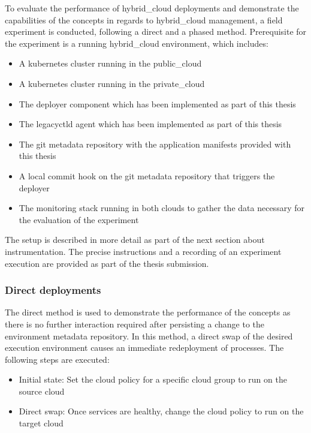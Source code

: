 \documentclass[../main.tex]{subfiles}
\begin{document}
    To evaluate the performance of \gls{hybrid_cloud} deployments and demonstrate the capabilities of the concepts in regards to \gls{hybrid_cloud} management, a field experiment is conducted, following a direct and a phased method.
    Prerequisite for the experiment is a running \gls{hybrid_cloud} environment, which includes:
    \begin{itemize}
        \setlength\itemsep{0em}
        \item A \gls{kubernetes} cluster running in the \gls{public_cloud}
        \item A \gls{kubernetes} cluster running in the \gls{private_cloud}
        \item The \gls{deployer} component which has been implemented as part of this thesis
        \item The \gls{legacyctld} agent which has been implemented as part of this thesis
        \item The \gls{git} metadata repository with the application manifests provided with this thesis
        \item A local commit hook on the \gls{git} metadata repository that triggers the \gls{deployer}
        \item The monitoring stack running in both \glspl{cloud} to gather the data necessary for the evaluation of the experiment
    \end{itemize}
    The setup is described in more detail as part of the next section about instrumentation.
    The precise instructions and a recording of an experiment execution are provided as part of the thesis submission.

    \subsubsection{Direct deployments}

    The direct method is used to demonstrate the performance of the concepts as there is no further interaction required after persisting a change to the environment metadata repository.
    In this method, a direct swap of the desired execution environment causes an immediate redeployment of processes.
    The following steps are executed:
    \begin{itemize}
        \setlength\itemsep{0em}
        \item Initial state: Set the \gls{cloud} policy for a specific \gls{cloud} group to run on the source \gls{cloud}
        \item Direct swap: Once services are healthy, change the \gls{cloud} policy to run on the target \gls{cloud}
    \end{itemize}
\end{document}
